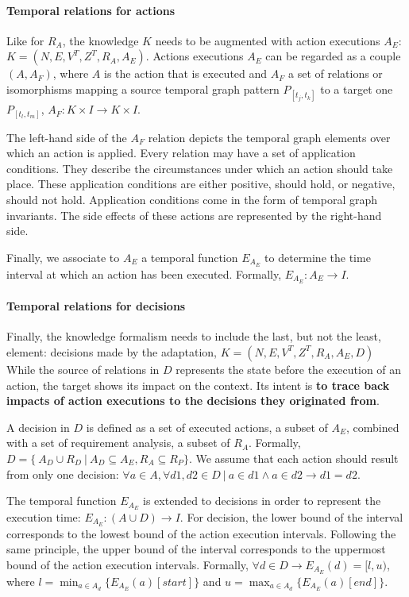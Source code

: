 \paragraph{Temporal relations for actions}
Like for $R_A$, the knowledge $K$ needs to be augmented with action executions $A_E$: $K = (N, E, V^T, Z^T, R_A, A_E)$.
Actions executions $A_E$ can be regarded as a couple $(A, A_F)$, where $A$ is the action that is executed and $A_F$ a set of relations or isomorphisms mapping a source temporal graph pattern $P_{[t_j, t_k]}$ to a target one $P_{[t_l, t_m]}$,  $A_F : K \times I \rightarrow K \times I$.

The left-hand side of the $A_F$ relation depicts the temporal graph elements over which an action is applied.
Every relation may have a set of application conditions. 
They describe the circumstances under which an action should take place. 
These application conditions are either positive, should hold, or negative, should not hold. 
Application conditions come in the form of temporal graph invariants.  
The side effects of these actions are represented by the right-hand side. 

Finally, we associate to $A_E$ a temporal function $E_{A_E}$ to determine the time interval at which an action has been executed. 
Formally, $E_{A_E}: A_E \rightarrow I$.

\paragraph{Temporal relations for decisions}
Finally, the knowledge formalism needs to include the last, but not the least, element: decisions made by the adaptation, $K = (N, E, V^T, Z^T, R_A, A_E, D)$
While the source of relations in $D$ represents the state before the execution of an action, the target shows its impact on the \gls{context}. 
Its intent is \textbf{to trace back impacts of action executions to the decisions they originated from}.  

A decision in ${D}$ is defined as a set of executed actions, \ie a subset of ${A_E}$, combined with a set of requirement analysis, \ie a subset of ${R_A}$.
Formally, ${D} = \{\ {A_D \cup R_D}~|~{A_D}  \subseteq A_E, R_A \subseteq R_P\}$.
We assume that each action should result from only one decision: $\forall a \in {A}, \forall d1, d2 \in {D}~|~a \in d1 \wedge a \in d2 \rightarrow d1 = d2$.

The temporal function $E_{A_E}$ is extended to decisions in order to represent the execution time: $E_{A_E}: (A \cup D) \rightarrow I$.
For decision, the lower bound of the interval corresponds to the lowest bound of the action execution intervals.
Following the same principle, the upper bound of the interval corresponds to the uppermost bound of the action execution intervals.
Formally, $\forall d \in D \rightarrow E_{A_E}(d) = [l,u)$, where $l = \displaystyle \min_{a \in A_d} \{E_{A_E}(a)[start]\}$ and $u = \displaystyle \max_{a \in A_d} \{E_{A_E}(a)[end]\}$.

